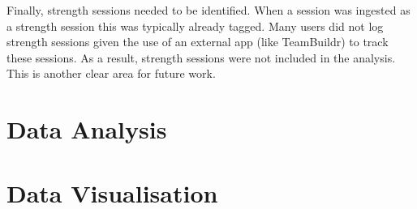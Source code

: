 Finally, strength sessions needed to be identified. When a session was ingested as a strength session this was typically already tagged. Many users did not log strength sessions given the use of an external app (like TeamBuildr) to track these sessions. As a result, strength sessions were not included in the analysis. This is another clear area for future work.

\section{Data Analysis}

\section{Data Visualisation}